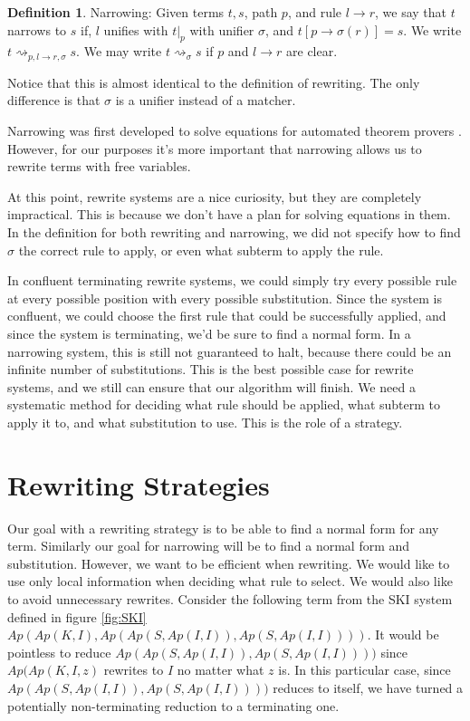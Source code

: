 \documentclass{book}
\theoremstyle{definition}
\newtheorem{definition}{Definition}[section]
\begin{document}
\theoremstyle{definition}
\begin{definition}{Narrowing:}
Given terms $t,s$, path $p$, and rule $l \to r$, we say that $t$ narrows to $s$ if, 
$l$ unifies with $t\vert_p$ with unifier $\sigma$, and $t[p \to \sigma(r)] = s$.
We write $t \rightsquigarrow_{p,l\to r,\sigma} s$.
We may write $t \rightsquigarrow_\sigma s$ if $p$ and $l \to r$ are clear.
\end{definition}

Notice that this is almost identical to the definition of rewriting.
The only difference is that $\sigma$ is a unifier instead of a matcher.

Narrowing was first developed to solve equations for automated theorem provers \cite{narrowing}.
However, for our purposes it's more important that narrowing allows us to
rewrite terms with free variables. \cite{multiparadigm}

At this point, rewrite systems are a nice curiosity,
but they are completely impractical. 
This is because we don't have a plan for solving equations in them.
In the definition for both rewriting and narrowing,
we did not specify how to find $\sigma$ the correct rule to apply, or even
what subterm to apply the rule.

In confluent terminating rewrite systems, we could simply try every possible rule
at every possible position with every possible substitution.
Since the system is confluent, we could choose the first rule that could be successfully applied,
and since the system is terminating, we'd be sure to find a normal form.
In a narrowing system, this is still not guaranteed to halt, because there could be
an infinite number of substitutions.
This is the best possible case for rewrite systems, 
and we still can ensure that our algorithm will finish.
We need a systematic method for deciding what rule should be applied,
what subterm to apply it to,
and what substitution to use.
This is the role of a strategy.

\section{Rewriting Strategies}

Our goal with a rewriting strategy is to be able to find a normal form for any term.
Similarly our goal for narrowing will be to find a normal form and substitution.
However, we want to be efficient when rewriting.
We would like to use only local information when deciding what rule to select.
We would also like to avoid unnecessary rewrites.
Consider the following term from the SKI system defined in figure \ref{fig:SKI}
$Ap(Ap(K, I), Ap(Ap(S,Ap(I,I)),Ap(S,Ap(I,I))))$.
It would be pointless to reduce $Ap(Ap(S,Ap(I,I)),Ap(S,Ap(I,I))))$ since $Ap(Ap(K,I,z)$ rewrites to $I$
no matter what $z$ is.
In this particular case, since $Ap(Ap(S,Ap(I,I)),Ap(S,Ap(I,I))))$ reduces to itself,
we have turned a potentially non-terminating reduction to a terminating one.
\end{document}
